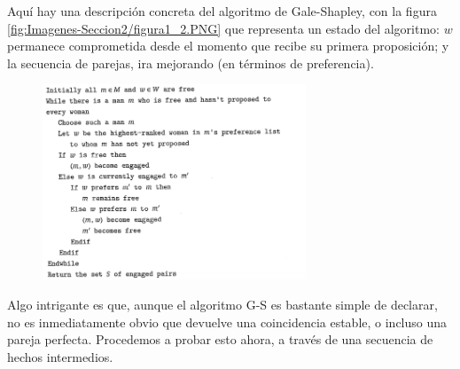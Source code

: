 \documentclass[a4paper]{article}
\begin{document}
	Aquí hay una descripción concreta del algoritmo de Gale-Shapley, con la figura \ref{fig:Imagenes-Seccion2/figura1_2.PNG} que representa un estado del algoritmo: $w$ permanece comprometida desde el momento que recibe su primera proposición; y la secuencia de parejas, ira mejorando (en términos de preferencia).
\begin{figure}[h] 
  \centering
    \includegraphics[width=0.7\textwidth]{Imagenes-Seccion2/Imagen1_2.PNG}
\end{figure}

	Algo intrigante es que, aunque el algoritmo G-S es bastante simple de declarar, no es inmediatamente obvio que devuelve una coincidencia estable, o incluso una pareja perfecta. Procedemos a probar esto ahora, a través de una secuencia de hechos intermedios.
\\
\end{document}
